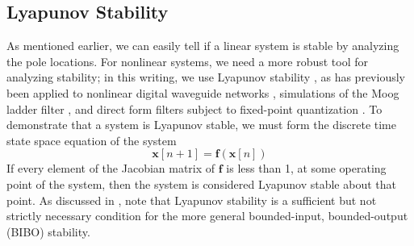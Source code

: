 \documentclass[twoside,a4paper]{article}
\begin{document}
\subsection{Lyapunov Stability}
%
As mentioned earlier, we can easily tell if a linear system is stable
by analyzing the pole locations. For nonlinear systems, we need a
more robust tool for analyzing stability; in this writing, we use
Lyapunov stability \cite{Lyapunov}, as has previously been applied
to nonlinear digital waveguide networks \cite{JOS-Waveguide},
simulations of the Moog ladder filter \cite{HelieMoog}, and
direct form filters subject to fixed-point quantization
\cite{LyapunovFixedPointFilters}. To demonstrate that a system is
Lyapunov stable, we must form the discrete time state space
equation of the system
%
\begin{equation}
    \mathbf{x}[n+1] = \mathbf{f}(\mathbf{x}[n])
    \label{eq:lyapunov_general}
\end{equation}
%
If every element of the Jacobian matrix of $\mathbf{f}$ is less than 1,
at some operating point of the system, then the system is considered
Lyapunov stable about that point. As discussed in \cite{HelieMoog},
note that Lyapunov stability is a sufficient but not strictly necessary
condition for the more general bounded-input, bounded-output (BIBO) stability.
\end{document}

